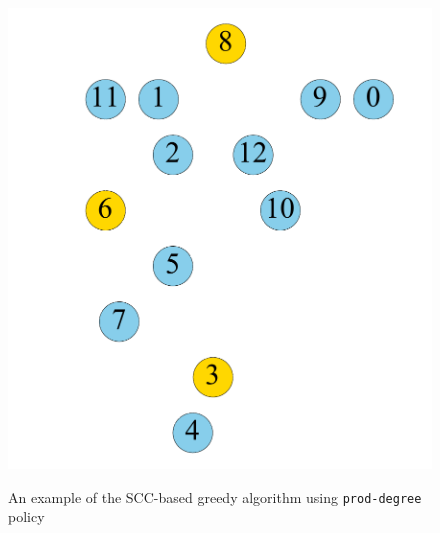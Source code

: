 \begin{figure}[t]
\begin{minipage}[b]{0.19\linewidth}
                        {\includegraphics[width=\textwidth]{./alg_fig/scc-g7}}
   		\end{minipage}  
  	\vspace{-1em}             
   \caption{An example of the SCC-based greedy algorithm using \texttt{prod-degree} policy}
   \label{fig:scc}
\end{figure}


